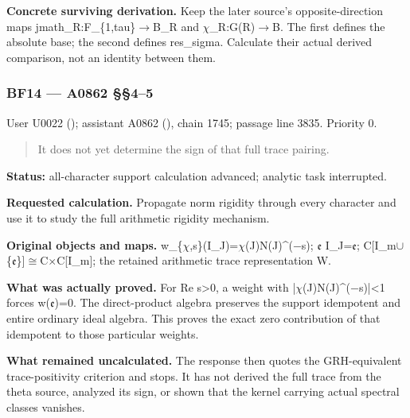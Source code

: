 \textbf{Concrete surviving derivation.} Keep the later source's
opposite-direction maps
jmath\_R:F\_\{1,tau\}\allowbreak{}\ensuremath{→}\allowbreak{}B\_R and
\allowbreak{}\ensuremath{χ}\allowbreak{}\_R:G(R)\allowbreak{}\ensuremath{→}\allowbreak{}B.
The first defines the absolute base; the second defines res\_sigma.
Calculate their actual derived comparison, not an identity between them.

\subsubsection{BF14 --- A0862 §§4--5}\label{TranscriptLedgerStage:bf14-a0862-45}

User U0022 (\protect{});
assistant A0862 (\protect{}),
chain 1745; passage line 3835. Priority 0.

\begin{quote}
It does not yet determine the sign of that full trace pairing.
\end{quote}

\textbf{Status:} all-character support calculation advanced; analytic
task interrupted.

\textbf{Requested calculation.} Propagate norm rigidity through every
character and use it to study the full arithmetic rigidity mechanism.

\textbf{Original objects and maps.}
w\_\{\allowbreak{}\ensuremath{χ}\allowbreak{},s\}(I\_J)=\allowbreak{}\ensuremath{χ}\allowbreak{}(J)N(J)\textasciicircum{}(\allowbreak{}\ensuremath{−}\allowbreak{}s);
\allowbreak{}\ensuremath{𝔢}\allowbreak{}
I\_J=\allowbreak{}\ensuremath{𝔢}\allowbreak{};
C[I\_m\allowbreak{}\ensuremath{∪}\allowbreak{}\{\allowbreak{}\ensuremath{𝔢}\allowbreak{}\}]\allowbreak{}\ensuremath{≅}\allowbreak{}C\allowbreak{}\ensuremath{×}\allowbreak{}C[I\_m];
the retained arithmetic trace representation W.

\textbf{What was actually proved.} For Re s\textgreater0, a weight with
|\allowbreak{}\ensuremath{χ}\allowbreak{}(J)N(J)\textasciicircum{}(\allowbreak{}\ensuremath{−}\allowbreak{}s)|<1
forces w(\allowbreak{}\ensuremath{𝔢}\allowbreak{})=0. The direct-product
algebra preserves the support idempotent and entire ordinary ideal
algebra. This proves the exact zero contribution of that idempotent to
those particular weights.

\textbf{What remained uncalculated.} The response then quotes the
GRH-equivalent trace-positivity criterion and stops. It has not derived
the full trace from the theta source, analyzed its sign, or shown that
the kernel carrying actual spectral classes vanishes.

